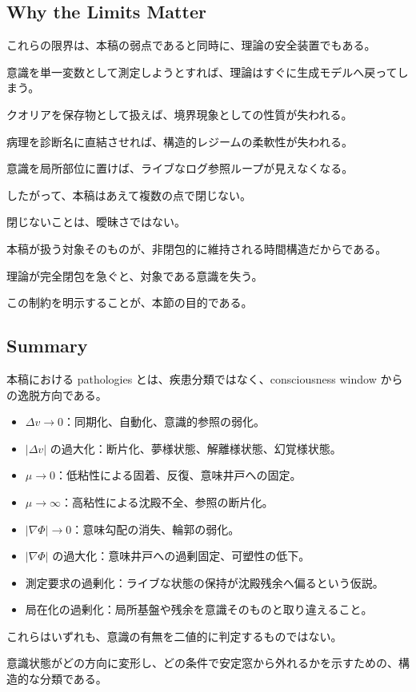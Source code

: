 \subsection{Why the Limits Matter}

これらの限界は、本稿の弱点であると同時に、理論の安全装置でもある。

意識を単一変数として測定しようとすれば、理論はすぐに生成モデルへ戻ってしまう。

クオリアを保存物として扱えば、境界現象としての性質が失われる。

病理を診断名に直結させれば、構造的レジームの柔軟性が失われる。

意識を局所部位に置けば、ライブなログ参照ループが見えなくなる。

したがって、本稿はあえて複数の点で閉じない。

閉じないことは、曖昧さではない。

本稿が扱う対象そのものが、非閉包的に維持される時間構造だからである。

理論が完全閉包を急ぐと、対象である意識を失う。

この制約を明示することが、本節の目的である。

\subsection{Summary}

本稿における pathologies とは、疾患分類ではなく、consciousness window からの逸脱方向である。

\begin{itemize}
\item $\Delta v \rightarrow 0$：同期化、自動化、意識的参照の弱化。
\item $|\Delta v|$ の過大化：断片化、夢様状態、解離様状態、幻覚様状態。
\item $\mu \rightarrow 0$：低粘性による固着、反復、意味井戸への固定。
\item $\mu \rightarrow \infty$：高粘性による沈殿不全、参照の断片化。
\item $|\nabla \Phi| \rightarrow 0$：意味勾配の消失、輪郭の弱化。
\item $|\nabla \Phi|$ の過大化：意味井戸への過剰固定、可塑性の低下。
\item 測定要求の過剰化：ライブな状態の保持が沈殿残余へ偏るという仮説。
\item 局在化の過剰化：局所基盤や残余を意識そのものと取り違えること。
\end{itemize}

これらはいずれも、意識の有無を二値的に判定するものではない。

意識状態がどの方向に変形し、どの条件で安定窓から外れるかを示すための、構造的な分類である。
